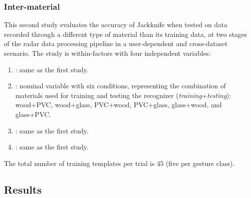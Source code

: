 \subsubsection{Inter-material} \label{sec:radar-experiments:through-materials:protocol:inter-material}
This second study evaluates the accuracy of Jackknife when tested on data recorded through a different type of material than its training data, at two stages of the radar data processing pipeline in a user-dependent and cross-dataset scenario. The study is within-factors with four independent variables:
{\sloppy
\begin{enumerate}
    \item {}: same as the first study.
    \item {}: nominal variable with six conditions, representing the combination of materials used for training and testing the recognizer (\textit{training}+\textit{testing}): wood+PVC, wood+glass, PVC+wood, PVC+glass, glass+wood, and glass+PVC.
    \item {}: same as the first study.
    \item {}: same as the first study.
\end{enumerate}
}
The total number of training templates per trial is 45 (five per gesture class).

\subsection{Results} \label{sec:radar-experiments:through-materials:results}

